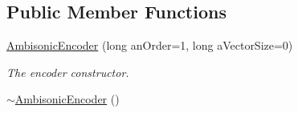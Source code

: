 \subsection*{Public Member Functions}
\begin{DoxyCompactItemize}
\item 
\hyperlink{class_ambisonic_encoder_acf62830cd4a81423886be0f298fc0705}{Ambisonic\-Encoder} (long an\-Order=1, long a\-Vector\-Size=0)
\begin{DoxyCompactList}\small\item\em The encoder constructor. \end{DoxyCompactList}\item 
\hypertarget{class_ambisonic_encoder_a99cb2fbfd9c75c9fac713aff3bc61f54}{\hyperlink{class_ambisonic_encoder_a99cb2fbfd9c75c9fac713aff3bc61f54}{$\sim$\-Ambisonic\-Encoder} ()}\label{class_ambisonic_encoder_a99cb2fbfd9c75c9fac713aff3bc61f54}


\end{DoxyCompactItemize}
